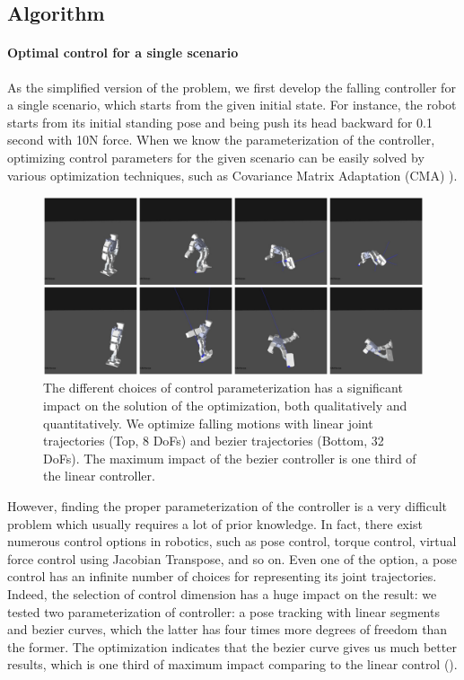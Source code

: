 \subsection{Algorithm}

\paragraph{Optimal control for a single scenario}

As the simplified version of the problem, we first develop the falling
controller for a single scenario, which starts from the given initial 
state.
For instance, the robot starts from its initial standing pose and 
being push its head backward for 0.1 second with 10N force.
When we know the parameterization of the controller, optimizing
control parameters for the given scenario can be easily solved
by various optimization techniques, such as 
Covariance Matrix Adaptation (CMA) \cite{Hansen:2004:CMA}).

\begin{figure}[htbp]
\center
  \includegraphics[width=\linewidth]{images/falling2_result}
  \caption{
    The different choices of control parameterization has a significant
    impact on the solution of the optimization, both qualitatively
    and quantitatively.
    We optimize falling motions with linear joint trajectories (Top, 8 DoFs)
    and bezier trajectories (Bottom, 32 DoFs). The maximum impact of the
    bezier controller is one third of the linear controller.}
 \label{fig:robotFalling}
\end{figure}

However, finding the proper parameterization of the controller
is a very difficult problem which usually requires a lot of prior knowledge.
In fact, there exist numerous control options in robotics, such as
pose control, torque control, virtual force control using Jacobian
Transpose, and so on.
Even one of the option, a pose control has an infinite number of choices for
representing its joint trajectories.
Indeed, the selection of control dimension has a huge impact on the
result: we tested two parameterization of controller: a pose tracking 
with linear segments and bezier curves, which the latter has four times
more degrees of freedom than the former.
The optimization indicates that the bezier curve gives us 
much better results, which is one third of maximum impact
comparing to the linear control ().

